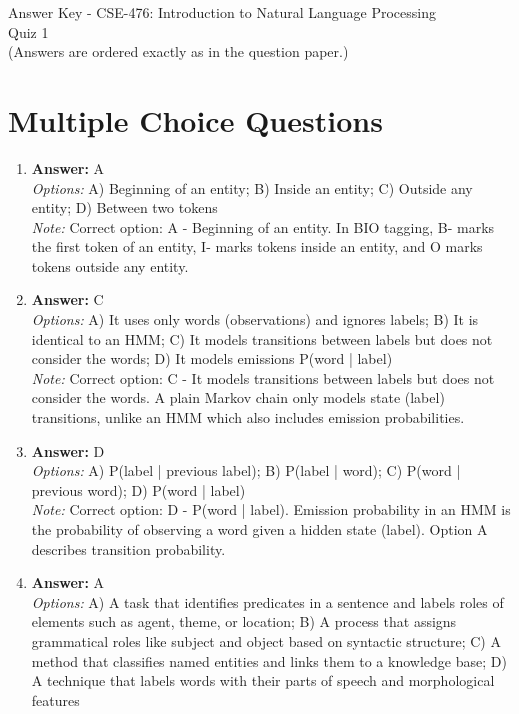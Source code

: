 \documentclass[12pt]{article}
\begin{document}
\begin{center}
Answer Key - CSE-476: Introduction to Natural Language Processing \\
Quiz 1 \\
\small (Answers are ordered exactly as in the question paper.)
\end{center}

\section*{Multiple Choice Questions}
\begin{enumerate}[label=Q\arabic*.]
\item \textbf{Answer:} A
\\ \textit{Options:} A) Beginning of an entity; B) Inside an entity; C) Outside any entity; D) Between two tokens
\\ \textit{Note:} Correct option: A - Beginning of an entity. In BIO tagging, B- marks the first token of an entity, I- marks tokens inside an entity, and O marks tokens outside any entity.
\item \textbf{Answer:} C
\\ \textit{Options:} A) It uses only words (observations) and ignores labels; B) It is identical to an HMM; C) It models transitions between labels but does not consider the words; D) It models emissions P(word | label)
\\ \textit{Note:} Correct option: C - It models transitions between labels but does not consider the words. A plain Markov chain only models state (label) transitions, unlike an HMM which also includes emission probabilities.
\item \textbf{Answer:} D
\\ \textit{Options:} A) P(label | previous label); B) P(label | word); C) P(word | previous word); D) P(word | label)
\\ \textit{Note:} Correct option: D - P(word | label). Emission probability in an HMM is the probability of observing a word given a hidden state (label). Option A describes transition probability.
\item \textbf{Answer:} A
\\ \textit{Options:} A) A task that identifies predicates in a sentence and labels roles of elements such as agent, theme, or location; B) A process that assigns grammatical roles like subject and object based on syntactic structure; C) A method that classifies named entities and links them to a knowledge base; D) A technique that labels words with their parts of speech and morphological features

\end{enumerate}
\end{document}
